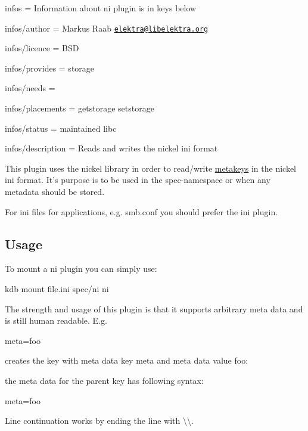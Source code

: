 
\begin{DoxyItemize}
\item infos = Information about ni plugin is in keys below
\item infos/author = Markus Raab \href{mailto:elektra@libelektra.org}{\tt elektra@libelektra.\+org}
\item infos/licence = B\+S\+D
\item infos/provides = storage
\item infos/needs =
\item infos/placements = getstorage setstorage
\item infos/status = maintained libc
\item infos/description = Reads and writes the nickel ini format
\end{DoxyItemize}

This plugin uses the nickel library in order to read/write \hyperlink{md_doc_help_elektra-meta-data_doc_help_elektra-meta-data_md}{metakeys} in the nickel ini format. It's purpose is to be used in the {\ttfamily spec}-\/namespace or when any metadata should be stored.

For ini files for applications, e.\+g. smb.\+conf you should prefer the ini plugin.

\subsection*{Usage}

To mount a ni plugin you can simply use\+: \begin{DoxyVerb}kdb mount file.ini spec/ni ni
\end{DoxyVerb}


The strength and usage of this plugin is that it supports arbitrary meta data and is still human readable. E.\+g. \begin{DoxyVerb}[key]
meta=foo
\end{DoxyVerb}


creates the key with meta data key {\ttfamily meta} and meta data value {\ttfamily foo}\+: 


the meta data for the parent key has following syntax\+: \begin{DoxyVerb}[]
meta=foo
\end{DoxyVerb}


Line continuation works by ending the line with {\ttfamily \textbackslash{}\textbackslash{}}.

